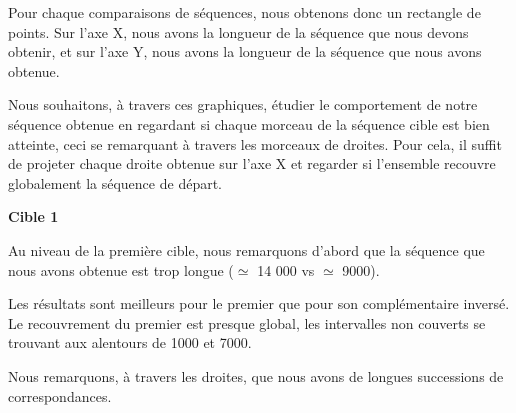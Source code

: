 Pour chaque comparaisons de séquences, nous obtenons donc un rectangle de
points. Sur l'axe X, nous avons la longueur de la séquence que nous devons
obtenir, et sur l'axe Y, nous avons la longueur de la séquence que nous avons
obtenue.

Nous souhaitons, à travers ces graphiques, étudier le comportement de notre
séquence obtenue en regardant si chaque morceau de la séquence cible est bien
atteinte, ceci se remarquant à travers les morceaux de droites. Pour cela, il
suffit de projeter chaque droite obtenue sur l'axe X et regarder si l'ensemble
recouvre globalement la séquence de départ.

\noindent\textbf{Cible 1}

Au niveau de la première cible, nous remarquons d'abord que la séquence que nous
avons obtenue est trop longue ($\simeq$ 14 000 vs $\simeq$ 9000).

Les résultats sont meilleurs pour le premier que pour son complémentaire
inversé. Le recouvrement du premier est presque global, les intervalles non
couverts se trouvant aux alentours de 1000 et 7000.

Nous remarquons, à travers les droites, que nous avons de longues successions de
correspondances.

